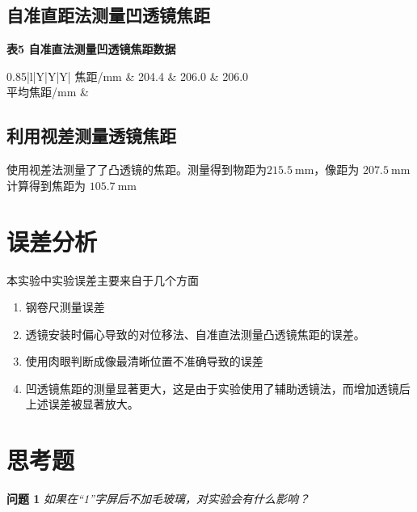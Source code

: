 \documentclass[10pt,a4paper]{article}	%
\makeatletter
\newenvironment{tablehere}
{\def\@captype{table}}
{}
\makeatother
\begin{document}
	\subsection{自准直距法测量凹透镜焦距}

	\begin{tablehere}
		\caption*{\bf 表5 自准直法测量凹透镜焦距数据}
		\noindent
		\begin{center}
			\begin{tabularx}{0.85\textwidth}{|l|Y|Y|Y|}
				\hline
				焦距/$\mathrm{mm}$ & 204.4 & 206.0 & 206.0 \\ \hline
				平均焦距/$\mathrm{mm}$ &  \\ \hline  		
			\end{tabularx}
			\vspace*{1em}
		\end{center}
	\end{tablehere}

	\subsection{利用视差测量透镜焦距}

	使用视差法测量了了凸透镜的焦距。测量得到物距为$215.5\mathrm{~mm}$，像距为 $207.5\mathrm{~mm}$ 计算得到焦距为 $105.7\mathrm{~mm}$

	\section{误差分析}

	本实验中实验误差主要来自于几个方面

	\begin{enumerate}
		\item 钢卷尺测量误差
		\item 透镜安装时偏心导致的对位移法、自准直法测量凸透镜焦距的误差。
		\item 使用肉眼判断成像最清晰位置不准确导致的误差
		\item 凹透镜焦距的测量显著更大，这是由于实验使用了辅助透镜法，而增加透镜后上述误差被显著放大。
	\end{enumerate}

	\section{思考题}

	\textbf {问题 1}\textsl{ 如果在“1”字屏后不加毛玻璃，对实验会有什么影响？}
\end{document}
